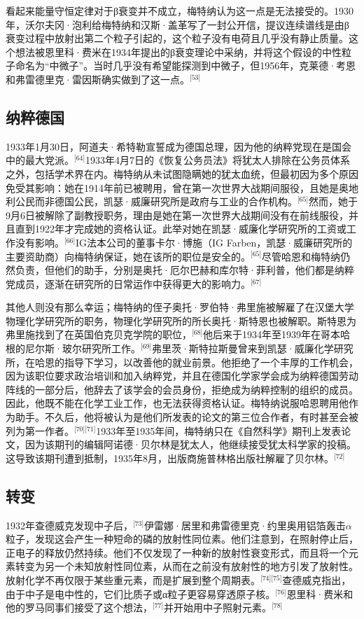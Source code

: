 看起来能量守恒定律对于β衰变并不成立，梅特纳认为这一点是无法接受的。1930年，沃尔夫冈·泡利给梅特纳和汉斯·盖革写了一封公开信，提议连续谱线是由β衰变过程中放射出第二个粒子引起的，这个粒子没有电荷且几乎没有静止质量。这个想法被恩里科·费米在1934年提出的β衰变理论中采纳，并将这个假设的中性粒子命名为“中微子”。当时几乎没有希望能探测到中微子，但1956年，克莱德·考恩和弗雷德里克·雷因斯确实做到了这一点。\(^\text{[53]}\)
\subsection{纳粹德国}
1933年1月30日，阿道夫·希特勒宣誓成为德国总理，因为他的纳粹党现在是国会中的最大党派。\(^\text{[64]}\)1933年4月7日的《恢复公务员法》将犹太人排除在公务员体系之外，包括学术界在内。梅特纳从未试图隐瞒她的犹太血统，但最初因为多个原因免受其影响：她在1914年前已被聘用，曾在第一次世界大战期间服役，且她是奥地利公民而非德国公民，凯瑟·威廉研究所是政府与工业的合作机构。\(^\text{[65]}\)然而，她于9月6日被解除了副教授职务，理由是她在第一次世界大战期间没有在前线服役，并且直到1922年才完成她的资格认证。此举对她在凯瑟·威廉化学研究所的工资或工作没有影响。\(^\text{[66]}\)IG法本公司的董事卡尔·博施（IG Farben，凯瑟·威廉研究所的主要资助商）向梅特纳保证，她在该所的职位是安全的。\(^\text{[65]}\)尽管哈恩和梅特纳仍然负责，但他们的助手，分别是奥托·厄尔巴赫和库尔特·菲利普，他们都是纳粹党成员，逐渐在研究所的日常运作中获得更大的影响力。\(^\text{[67]}\)

其他人则没有那么幸运；梅特纳的侄子奥托·罗伯特·弗里施被解雇了在汉堡大学物理化学研究所的职务，物理化学研究所的所长奥托·斯特恩也被解职。斯特恩为弗里施找到了在英国伯克贝克学院的职位，\(^\text{[68]}\)他后来于1934年至1939年在哥本哈根的尼尔斯·玻尔研究所工作。\(^\text{[69]}\)弗里茨·斯特拉斯曼曾来到凯瑟·威廉化学研究所，在哈恩的指导下学习，以改善他的就业前景。他拒绝了一个丰厚的工作机会，因为该职位要求政治培训和加入纳粹党，并且在德国化学家学会成为纳粹德国劳动阵线的一部分后，他辞去了该学会的会员身份，拒绝成为纳粹控制的组织的成员。因此，他既不能在化学工业工作，也无法获得资格认证。梅特纳说服哈恩聘用他作为助手。不久后，他将被认为是他们所发表的论文的第三位合作者，有时甚至会被列为第一作者。\(^\text{[70][71]}\)1933年至1935年间，梅特纳只在《自然科学》期刊上发表论文，因为该期刊的编辑阿诺德·贝尔林是犹太人，他继续接受犹太科学家的投稿。这导致该期刊遭到抵制，1935年8月，出版商施普林格出版社解雇了贝尔林。\(^\text{[72]}\)
\subsection{转变}
1932年查德威克发现中子后，\(^\text{[73]}\)伊雷娜·居里和弗雷德里克·约里奥用铝箔轰击$\alpha$粒子，发现这会产生一种短命的磷的放射性同位素。他们注意到，在照射停止后，正电子的释放仍然持续。他们不仅发现了一种新的放射性衰变形式，而且将一个元素转变为另一个未知放射性同位素，从而在之前没有放射性的地方引发了放射性。放射化学不再仅限于某些重元素，而是扩展到整个周期表。\(^\text{[74][75]}\)查德威克指出，由于中子是电中性的，它们比质子或α粒子更容易穿透原子核。\(^\text{[76]}\)恩里科·费米和他的罗马同事们接受了这个想法，\(^\text{[77]}\)并开始用中子照射元素。\(^\text{[78]}\)

